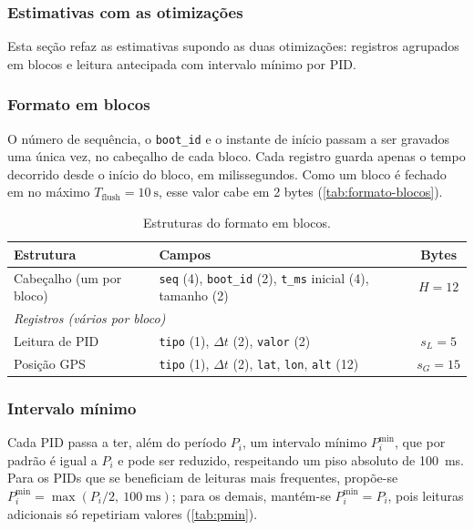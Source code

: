 \documentclass[12pt]{article}
\begin{document}
\subsubsection{Estimativas com as otimizações}
\label{sec:estimativas-otimizadas}
 
Esta seção refaz as estimativas supondo as duas otimizações: registros agrupados em blocos e leitura antecipada com intervalo mínimo por PID.
 
\subsubsection{Formato em blocos}
 
O número de sequência, o \texttt{boot\_id} e o instante de início passam a ser gravados uma única vez, no cabeçalho de cada bloco. Cada registro guarda apenas o tempo decorrido desde o início do bloco, em milissegundos. Como um bloco é fechado em no máximo $T_{\mathrm{flush}} = \SI{10}{\second}$, esse valor cabe em 2 bytes (\autoref{tab:formato-blocos}).

\begin{table}[htbp]
  \centering
  \caption{Estruturas do formato em blocos.}
  \label{tab:formato-blocos}
  \begin{tabular}{llc}
    \toprule
    Estrutura & Campos & Bytes \\
    \midrule
    Cabeçalho (um por bloco) & \texttt{seq} (4), \texttt{boot\_id} (2), \texttt{t\_ms} inicial (4), tamanho (2) & $H = 12$ \\
    \midrule
    \multicolumn{3}{l}{\textit{Registros (vários por bloco)}} \\
    \quad Leitura de PID & \texttt{tipo} (1), $\Delta t$ (2), \texttt{valor} (2) & $s_L = 5$ \\
    \quad Posição GPS    & \texttt{tipo} (1), $\Delta t$ (2), \texttt{lat}, \texttt{lon}, \texttt{alt} (12) & $s_G = 15$ \\
    \bottomrule
  \end{tabular}
\end{table}
 
\subsubsection{Intervalo mínimo}
 
Cada PID passa a ter, além do período $P_i$, um intervalo mínimo $P_i^{\min}$, que por padrão é igual a $P_i$ e pode ser reduzido, respeitando um piso absoluto de \SI{100}{\milli\second}. Para os PIDs que se beneficiam de leituras mais frequentes, propõe-se $P_i^{\min} = \max(P_i/2,\ \SI{100}{\milli\second})$; para os demais, mantém-se $P_i^{\min} = P_i$, pois leituras adicionais só repetiriam valores (\autoref{tab:pmin}).
 
\end{document}
